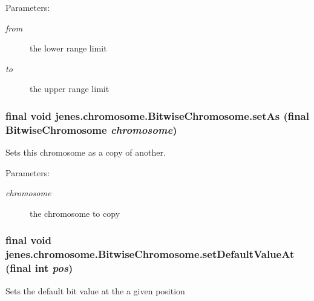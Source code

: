 \begin{Desc}
\item[Parameters:]
\begin{description}
\item[{\em from}]the lower range limit \item[{\em to}]the upper range limit \end{description}
\end{Desc}
\hypertarget{classjenes_1_1chromosome_1_1_bitwise_chromosome_a4fbad5a25ae14e9524a6ff0ec2536ca}{
\subsubsection[setAs]{\setlength{\rightskip}{0pt plus 5cm}final void jenes.chromosome.BitwiseChromosome.setAs (final {\bf BitwiseChromosome} {\em chromosome})}}
\label{classjenes_1_1chromosome_1_1_bitwise_chromosome_a4fbad5a25ae14e9524a6ff0ec2536ca}


Sets this chromosome as a copy of another.

\begin{Desc}
\item[Parameters:]
\begin{description}
\item[{\em chromosome}]the chromosome to copy \end{description}
\end{Desc}
\hypertarget{classjenes_1_1chromosome_1_1_bitwise_chromosome_e5be5fc21ff47526230a8a13ca945c08}{
\subsubsection[setDefaultValueAt]{\setlength{\rightskip}{0pt plus 5cm}final void jenes.chromosome.BitwiseChromosome.setDefaultValueAt (final int {\em pos})}}
\label{classjenes_1_1chromosome_1_1_bitwise_chromosome_e5be5fc21ff47526230a8a13ca945c08}


Sets the default bit value at the a given position

